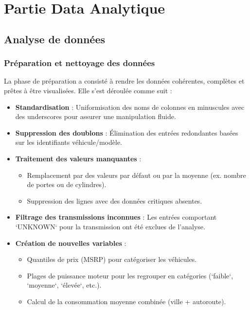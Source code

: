 \documentclass[12pt]{report}
\begin{document}
\chapter{Partie Data Analytique}

\thispagestyle{plain}
\pagestyle{plain}


\section{Analyse de données}

\subsection{Préparation et nettoyage des données}

La phase de préparation a consisté à rendre les données cohérentes, complètes et prêtes à être visualisées. Elle s’est déroulée comme suit :

\begin{itemize}
  \item \textbf{Standardisation} : Uniformisation des noms de colonnes en minuscules avec des underscores pour assurer une manipulation fluide.
  \item \textbf{Suppression des doublons} : Élimination des entrées redondantes basées sur les identifiants véhicule/modèle.
  \item \textbf{Traitement des valeurs manquantes} :
    \begin{itemize}
        \item Remplacement par des valeurs par défaut ou par la moyenne (ex. nombre de portes ou de cylindres).
        \item Suppression des lignes avec des données critiques absentes.
    \end{itemize}
  \item \textbf{Filtrage des transmissions inconnues} : Les entrées comportant `UNKNOWN` pour la transmission ont été exclues de l’analyse.
  \item \textbf{Création de nouvelles variables} :
    \begin{itemize}
        \item Quantiles de prix (MSRP) pour catégoriser les véhicules.
        \item Plages de puissance moteur pour les regrouper en catégories (`faible`, `moyenne`, `élevée`, etc.).
        \item Calcul de la consommation moyenne combinée (ville + autoroute).
    \end{itemize}
\end{itemize}
\end{document}
